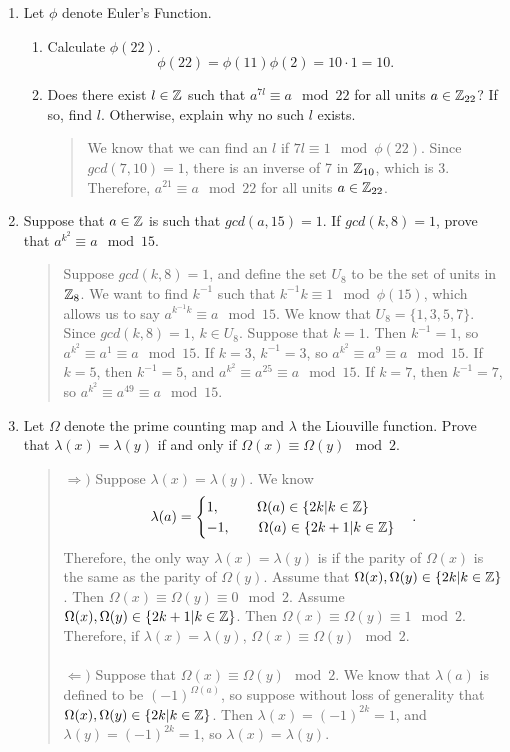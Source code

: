 \documentclass{hw}
\begin{document}
\begin{enumerate}
\item Let $\phi$ denote Euler's Function.
\begin{enumerate}
\item Calculate $\phi(22)$.
\[
\phi(22) = \phi(11)\phi(2)=10\cdot1 = 10.
\]
\item Does there exist $l\in\mathbb{Z}$ such that $a^{7l}\equiv a\mod 22$ for all units $a\in\mathbb{Z}_{22}$? If
so, find $l$. Otherwise, explain why no such $l$ exists.
\begin{quote}
We know that we can find an $l$ if $7l\equiv1\mod\phi(22)$. Since $gcd(7,10)=1$, there is an inverse
of 7 in $\mathbb{Z}_{10}$, which is 3. Therefore, $a^{21}\equiv a\mod22$ for all units $a\in\mathbb{Z}_{22}$.
\end{quote}
\end{enumerate}

\item Suppose that $a\in\mathbb{Z}$ is such that $gcd(a,15)=1$. If $gcd(k,8)=1$, prove that
$a^{k^{2}}\equiv a\mod15$.
\begin{quote}
Suppose $gcd(k,8)=1$, and define the set $U_{8}$ to be the set of units in $\mathbb{Z}_{8}$. We want to find
$k^{-1}$ such that $k^{-1}k\equiv1\mod\phi(15)$, which allows us to say $a^{k^{-1}k}\equiv a\mod15$.
We know that $U_{8}=\{ 1,3,5,7 \}$. Since $gcd(k,8)=1$, $k\in U_{8}$. Suppose that $k=1$. Then
$k^{-1}=1$, so $a^{k^{2}}\equiv a^{1}\equiv a\mod15$. If $k=3$, $k^{-1}=3$, so $a^{k^{2}}\equiv
a^{9}\equiv a\mod15$. If $k=5$, then $k^{-1}=5$, and $a^{k^{2}}\equiv a^{25}\equiv a\mod15$. If $k=7$,
then $k^{-1}=7$, so $a^{k^{2}}\equiv a^{49}\equiv a\mod15$.
\end{quote}

\item Let $\Omega$ denote the prime counting map and $\lambda$ the Liouville function. Prove that
$\lambda(x)=\lambda(y)$ if and only if $\Omega(x)\equiv\Omega(y)\mod2$.
\begin{quote}
$\Rightarrow)$ Suppose $\lambda(x)=\lambda(y)$. We know
\[
\lambda(a)=
\begin{cases}
1,\ \ \qquad\Omega(a)\in\{2k|k\in\mathbb{Z}\}\\
-1,\qquad\Omega(a)\in\{2k+1|k\in\mathbb{Z}\}
\end{cases}.
\]
Therefore, the only way $\lambda(x)=\lambda(y)$ is if the parity of $\Omega(x)$ is the same
as the parity of $\Omega(y)$. Assume that $\Omega(x),\Omega(y)\in\{ 2k|k\in\mathbb{Z}\}$. Then
$\Omega(x)\equiv\Omega(y)\equiv0\mod2$. Assume $\Omega(x),\Omega(y)\in\{ 2k+1|k\in\mathbb{Z}\}$. Then
$\Omega(x)\equiv\Omega(y)\equiv1\mod2$. Therefore, if $\lambda(x)=\lambda(y)$,
$\Omega(x)\equiv\Omega(y)\mod2$.\\\\
$\Leftarrow)$ Suppose that $\Omega(x)\equiv\Omega(y)\mod2$. We know that $\lambda(a)$ is defined
to be $(-1)^{\Omega(a)}$, so suppose without loss of generality that
$\Omega(x),\Omega(y)\in\{ 2k|k\in\mathbb{Z}\}$. Then $\lambda(x)=(-1)^{2k}=1$, and $\lambda(y)=(-1)^{2k}=1$,
so $\lambda(x)=\lambda(y)$.
\end{quote}


\end{enumerate}
\end{document}
